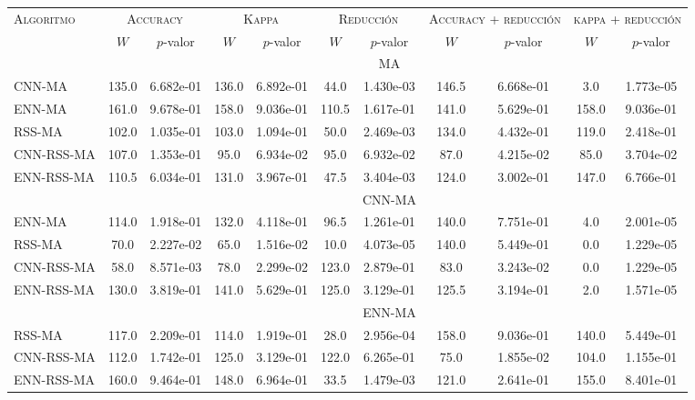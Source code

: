 \begin{table}[]
\centering
\begin{adjustbox}{max width =\textwidth}
\begin{tabular}{l c c c c c c c c c c}
\hline
\multirow{2}{*}{\textsc{Algoritmo}}
	& \multicolumn{2}{c}{\textsc{Accuracy}}
	& \multicolumn{2}{c}{\textsc{Kappa}}
	& \multicolumn{2}{c}{\textsc{Reducción}} 
	& \multicolumn{2}{c}{\textsc{Accuracy + reducción}} 
	& \multicolumn{2}{c}{\textsc{kappa + reducción}} \\
 & $W$ & $p$-valor & $W$ & $p$-valor & $W$ & $p$-valor & $W$ & $p$-valor & $W$ & $p$-valor \\
\hline
\hline

 & & & & & & MA & & & & \\

CNN-MA   & 135.0 & 6.682e-01 & 136.0 & 6.892e-01 & 44.0 & 1.430e-03 & 146.5 & 6.668e-01 & 3.0 & 1.773e-05 \\ 
ENN-MA & 161.0 & 9.678e-01 & 158.0 & 9.036e-01 & 110.5 & 1.617e-01 & 141.0 & 5.629e-01 & 158.0 & 9.036e-01 \\ 
RSS-MA  & 102.0 & 1.035e-01 & 103.0 & 1.094e-01 & 50.0 & 2.469e-03 & 134.0 & 4.432e-01 & 119.0 & 2.418e-01 \\ 
CNN-RSS-MA  & 107.0 & 1.353e-01 & 95.0 & 6.934e-02 & 95.0 & 6.932e-02 & 87.0 & 4.215e-02 & 85.0 & 3.704e-02 \\ 
ENN-RSS-MA & 110.5 & 6.034e-01 & 131.0 & 3.967e-01 & 47.5 & 3.404e-03 & 124.0 & 3.002e-01 & 147.0 & 6.766e-01 \\

\hline

 & & & & & & CNN-MA & & & & \\
ENN-MA  & 114.0 & 1.918e-01 & 132.0 & 4.118e-01 & 96.5 & 1.261e-01 & 140.0 & 7.751e-01 & 4.0 & 2.001e-05 \\ 
RSS-MA  & 70.0 & 2.227e-02 & 65.0 & 1.516e-02 & 10.0 & 4.073e-05 & 140.0 & 5.449e-01 & 0.0 & 1.229e-05 \\ 
CNN-RSS-MA  & 58.0 & 8.571e-03 & 78.0 & 2.299e-02 & 123.0 & 2.879e-01 & 83.0 & 3.243e-02 & 0.0 & 1.229e-05 \\ 
ENN-RSS-MA & 130.0 & 3.819e-01 & 141.0 & 5.629e-01 & 125.0 & 3.129e-01 & 125.5 & 3.194e-01 & 2.0 & 1.571e-05 \\

\hline

 & & & & & & ENN-MA & & & & \\
RSS-MA  & 117.0 & 2.209e-01 & 114.0 & 1.919e-01 & 28.0 & 2.956e-04 & 158.0 & 9.036e-01 & 140.0 & 5.449e-01 \\ 
CNN-RSS-MA  & 112.0 & 1.742e-01 & 125.0 & 3.129e-01 & 122.0 & 6.265e-01 & 75.0 & 1.855e-02 & 104.0 & 1.155e-01 \\ 
ENN-RSS-MA & 160.0 & 9.464e-01 & 148.0 & 6.964e-01 & 33.5 & 1.479e-03 & 121.0 & 2.641e-01 & 155.0 & 8.401e-01 \\


\end{tabular}
\end{adjustbox}
\end{table}
